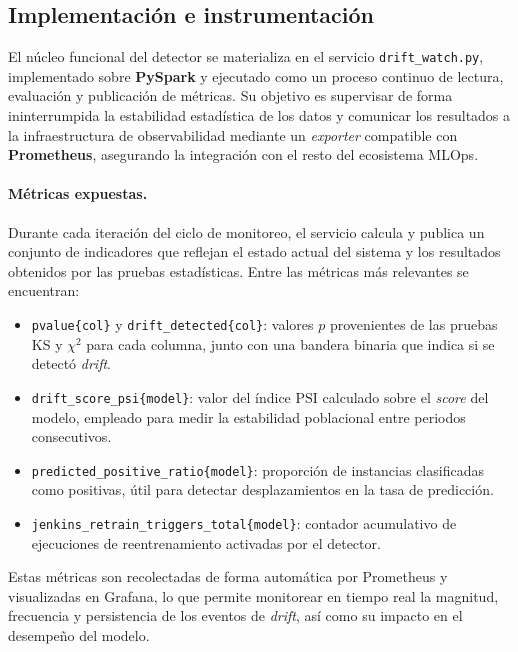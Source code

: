 \subsection{Implementación e instrumentación}

El núcleo funcional del detector se materializa en el servicio \texttt{drift\_watch.py}, implementado sobre \textbf{PySpark} y ejecutado como un proceso continuo de lectura, evaluación y publicación de métricas.  
Su objetivo es supervisar de forma ininterrumpida la estabilidad estadística de los datos y comunicar los resultados a la infraestructura de observabilidad mediante un \textit{exporter} compatible con \textbf{Prometheus}, asegurando la integración con el resto del ecosistema MLOps.

\paragraph{Métricas expuestas.}  
Durante cada iteración del ciclo de monitoreo, el servicio calcula y publica un conjunto de indicadores que reflejan el estado actual del sistema y los resultados obtenidos por las pruebas estadísticas.  
Entre las métricas más relevantes se encuentran:
\begin{itemize}\setlength\itemsep{2pt}
  \item \texttt{pvalue\{col\}} y \texttt{drift\_detected\{col\}}: valores $p$ provenientes de las pruebas KS y $\chi^2$ para cada columna, junto con una bandera binaria que indica si se detectó \textit{drift}.
  \item \texttt{drift\_score\_psi\{model\}}: valor del índice $\mathrm{PSI}$ calculado sobre el \textit{score} del modelo, empleado para medir la estabilidad poblacional entre periodos consecutivos.
  \item \texttt{predicted\_positive\_ratio\{model\}}: proporción de instancias clasificadas como positivas, útil para detectar desplazamientos en la tasa de predicción.
  \item \texttt{jenkins\_retrain\_triggers\_total\{model\}}: contador acumulativo de ejecuciones de reentrenamiento activadas por el detector.
\end{itemize}

Estas métricas son recolectadas de forma automática por Prometheus y visualizadas en Grafana, lo que permite monitorear en tiempo real la magnitud, frecuencia y persistencia de los eventos de \textit{drift}, así como su impacto en el desempeño del modelo.

